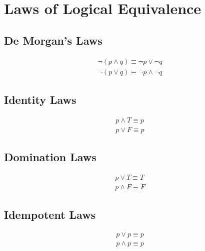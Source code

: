 \documentclass[12pt]{article}
\begin{document}
\pagebreak
\section{Laws of Logical Equivalence}
\setcounter{equation}{0}

\subsection{De Morgan's Laws}

\begin{subequations}\label{deMorgan}
\begin{align}
\neg (p \wedge q) \equiv \neg p \lor \neg q\label{de_first}\\
\neg (p \lor q) \equiv \neg p \wedge \neg q\label{de_second}
\end{align}
\end{subequations}

\subsection{Identity Laws}

\begin{subequations}\label{identity}
\begin{align}
p \wedge T \equiv p\label{id_first}\\
p \lor F \equiv p\label{id_second}
\end{align}
\end{subequations}

\subsection{Domination Laws}

\begin{subequations}\label{domination}
\begin{align}
p \lor T \equiv T\label{dom_first}\\
p \wedge F \equiv F\label{dom_second}
\end{align}
\end{subequations}

\subsection{Idempotent Laws}

\begin{subequations}\label{indempotent}
\begin{align}
p \lor p \equiv p\label{indem_first}\\
p \wedge p \equiv p\label{idem_second}
\end{align}
\end{subequations}
\end{document}
